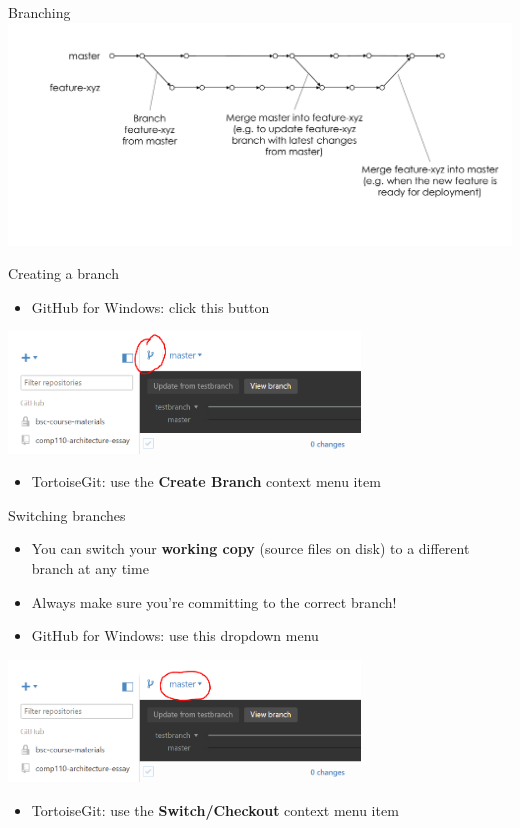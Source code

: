 \begin{frame}{Branching}
    \includegraphics[width=\textwidth]{branching}
\end{frame}

\begin{frame}{Creating a branch}
    \begin{itemize}
        \item GitHub for Windows: click this button
    \end{itemize}
    \begin{center}
        \includegraphics[width=0.7\textwidth]{github_create_branch}
    \end{center}
    \begin{itemize}
        \item TortoiseGit: use the \textbf{Create Branch} context menu item
    \end{itemize}
\end{frame}

\begin{frame}{Switching branches}
    \begin{itemize}
        \item You can switch your \textbf{working copy} (source files on disk) to a different branch
            at any time \pause
        \item Always make sure you're committing to the correct branch! \pause
        \item GitHub for Windows: use this dropdown menu
    \end{itemize}
    \begin{center}
        \includegraphics[width=0.7\textwidth]{github_switch_branch}
    \end{center}
    \begin{itemize}
        \item TortoiseGit: use the \textbf{Switch/Checkout} context menu item
    \end{itemize}
\end{frame}

